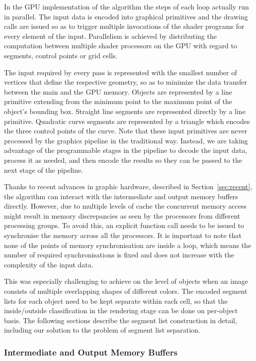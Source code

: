 \documentclass[11pt,a4paper,twoside]{article}
\begin{document}
In the GPU implementation of the algorithm the steps of each loop actually run in parallel. The input data is encoded into graphical primitives and the drawing calls are issued so as to trigger multiple invocations of the shader programs for every element of the input. Parallelism is achieved by distributing the computation between multiple shader processors on the GPU with regard to segments, control points or grid cells. 

The input required by every pass is represented with the smallest number of vertices that define the respective geometry, so as to minimize the data transfer between the main and the GPU memory. Objects are represented by a line primitive extending from the minimum point to the maximum point of the object's bounding box. Straight line segments are represented directly by a line primitive. Quadratic curve segments are represented by a triangle which encodes the three control points of the curve. Note that these input primitives are never processed by the graphics pipeline in the traditional way. Instead, we are taking advantage of the programmable stages in the pipeline to decode the input data, process it as needed, and then encode the results so they can be passed to the next stage of the pipeline.

Thanks to recent advances in graphic hardware, described in Section~\ref{sec:recent}, the algorithm can interact with the intermediate and output memory buffers directly. However, due to multiple levels of cache the concurrent memory access might result in memory discrepancies as seen by the processors from different processing groups. To avoid this, an explicit function call needs to be issued to synchronise the memory across all the processors. It is important to note that none of the points of memory synchronisation are inside a loop, which means the number of required synchronisations is fixed and does not increase with the complexity of the input data. 

This was especially challenging to achieve on the level of objects when an image consists of multiple overlapping shapes of different colors. The encoded segment lists for each object need to be kept separate within each cell, so that the inside/outside classification in the rendering stage can be done on per-object basis. The following sections describe the segment list construction in detail, including our solution to the problem of segment list separation.

\subsubsection{Intermediate and Output Memory Buffers}
\end{document}
